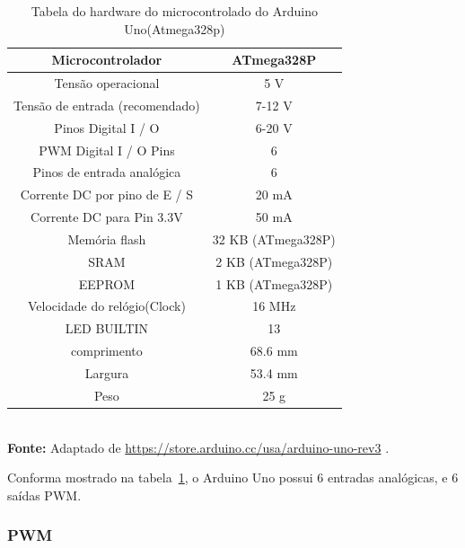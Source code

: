 \FloatBarrier
\begin{table}[!htbp]
	\centering
	\caption{Tabela do hardware do microcontrolado do Arduino Uno(Atmega328p)}
	\begin{tabular}{ c | c }
		\hline
		Microcontrolador                & ATmega328P         \\ \hline
		Tensão operacional              & 5 V                \\ \hline
		Tensão de entrada (recomendado) & 7-12 V             \\ \hline
		Pinos Digital I / O             & 6-20 V             \\ \hline
		PWM Digital I / O Pins          & 6                  \\ \hline
		Pinos de entrada analógica      & 6                  \\ \hline
		Corrente DC por pino de E / S   & 20 mA              \\ \hline
		Corrente DC para Pin 3.3V       & 50 mA              \\ \hline
		Memória flash                   & 32 KB (ATmega328P) \\ \hline
		SRAM                            & 2 KB (ATmega328P)  \\ \hline
		EEPROM                          & 1 KB (ATmega328P)  \\ \hline
		Velocidade do relógio(Clock)    & 16 MHz             \\ \hline
		LED BUILTIN                     & 13                 \\ \hline
		comprimento                     & 68.6 mm            \\ \hline
		Largura                         & 53.4 mm            \\ \hline
		Peso                            & 25 g               \\ \hline
	\end{tabular}
	\\ \vspace{0.2cm}
	\textbf{Fonte:} Adaptado de \url{https://store.arduino.cc/usa/arduino-uno-rev3} .
	\label{tab:ArduinoUno}
\end{table}
\FloatBarrier

Conforma mostrado na tabela~\ref{tab:ArduinoUno}, o Arduino Uno possui 6 entradas analógicas, e 6 saídas PWM.

\subsubsection{PWM}

